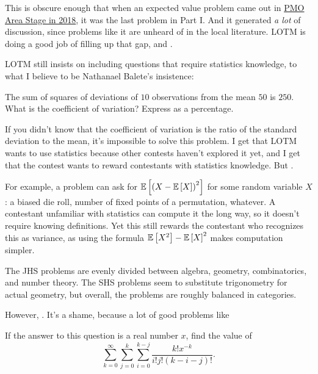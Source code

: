 \documentclass[11pt,paper=letter]{scrartcl}
\begin{document}
This is obscure enough that when an expected value problem came out in \href{http://cjquines.com/files/pmo2018areas.pdf}{PMO Area Stage in 2018}, it was the last problem in Part I. And it generated \emph{a lot} of discussion, since problems like it are unheard of in the local literature. LOTM is doing a good job of filling up that gap, and .

LOTM still insists on including questions that require statistics knowledge, to what I believe to be Nathanael Balete's insistence:

\begin{probboxed}
   The sum of squares of deviations of $10$ observations from the mean $50$ is $250$. What is the coefficient of variation? Express as a percentage.
\end{probboxed}

If you didn't know that the coefficient of variation is the ratio of the standard deviation to the mean, it's impossible to solve this problem. I get that LOTM wants to use statistics because other contests haven't explored it yet, and I get that the contest wants to reward contestants with statistics knowledge. But .

For example, a problem can ask for $\mathbb{E}\left[ \left( X - \mathbb{E}\left[ X \right] \right)^2 \right]$ for some random variable $X$: a biased die roll, number of fixed points of a permutation, whatever. A contestant unfamiliar with statistics can compute it the long way, so it doesn't require knowing definitions. Yet this still rewards the contestant who recognizes this as variance, as using the formula $\mathbb{E}\left[ X^2 \right] - \mathbb{E}\left[ X \right]^2$ makes computation simpler.

The JHS problems are evenly divided between algebra, geometry, combinatorics, and number theory. The SHS problems seem to substitute trigonometry for actual geometry, but overall, the problems are roughly balanced in categories.

However, . It's a shame, because a lot of good problems like

\begin{probboxed}
   If the answer to this question is a real number $x$, find the value of $$\sum_{k=0}^{\infty}\sum_{j=0}^k\sum_{i=0}^{k-j} \frac{k!x^{-k}}{i!j!(k-i-j)!}.$$
\end{probboxed}
\end{document}
